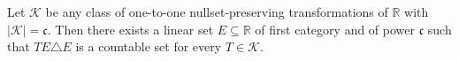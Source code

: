 Let $\mathcal{K}$ be any class of one-to-one nullset-preserving transformations of $\mathbb{R}$ with $|\mathcal{K}| = \mathfrak{c}$. Then there exists a linear set $E \subseteq \mathbb{R}$ of first category and of power $\mathfrak{c}$ such that $TE \triangle E$ is a countable set for every $T \in \mathcal{K}$.
